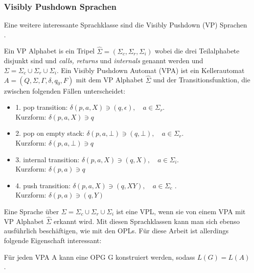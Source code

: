 \subsubsection{Visibly Pushdown Sprachen}
Eine weitere interessante Sprachklasse sind die Visibly Pushdown (VP) Sprachen \cite{vpl}.
\begin{definition}
Ein VP Alphabet is ein Tripel $\hat{\Sigma}=(\Sigma_c, \Sigma_r, \Sigma_i)$ wobei die drei Teilalphabete disjunkt sind und \textit{calls, returns} und \textit{internals} genannt werden und $\Sigma=\Sigma_c \cup \Sigma_r \cup \Sigma_i$. Ein Visibly Pushdown Automat (VPA) ist ein Kellerautomat $A=(Q, \Sigma, \Gamma, \delta, q_0, F)$ mit dem VP Alphabet $\hat{\Sigma}$ und der Transitionsfunktion, die zwischen folgenden Fällen unterscheidet:
\begin{itemize}
\item
1. pop transition: $\delta(p,a,X) \ni (q, \epsilon), \quad a \in \Sigma_r$.\\
 Kurzform: $\delta(p, a, X) \ni q$
\item
2. pop on empty stack: $\delta(p, a, \bot) \ni (q, \bot), \quad a \in \Sigma_r$.\\
 Kurzform: $\delta(p, a, \bot) \ni q$
\item
3. internal transition: $\delta(p,a,X) \ni (q, X), \quad a \in \Sigma_i$. \\Kurzform:
 $\delta(p, a) \ni q$
\item
4. push transition: $\delta(p, a, X) \ni (q, XY), \quad a \in \Sigma_c$ .\\ Kurzform:
 $\delta(p, a) \ni (q, Y)$
\end{itemize}
\end{definition}
Eine Sprache über $\Sigma=\Sigma_c \cup \Sigma_r \cup \Sigma_i$ ist eine VPL, wenn sie von einem VPA mit VP Alphabet $\hat{\Sigma}$ erkannt wird.
Mit diesen Sprachklassen kann man sich ebenso ausführlich beschäftigen, wie mit den OPLs. Für diese Arbeit ist allerdings folgende Eigenschaft interessant\cite{op_vpl_property}:
\begin{lemma}
Für jeden VPA A kann eine OPG G konstruiert werden, sodass $L(G)=L(A)$.
\end{lemma}
